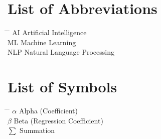 \documentclass[12pt,a4paper]{report}
\renewcommand{\baselinestretch}{1.5}
\begin{document}
\renewcommand\bibname{References} %








\clearpage %
\chapter*{List of Abbreviations}

\begin{tabbing}
    \hspace{2cm} \= \hspace{5cm} \= \kill
    AI \> Artificial Intelligence \\
    ML \> Machine Learning \\
    NLP \> Natural Language Processing \\
\end{tabbing}


\chapter*{List of Symbols}
\begin{tabbing}
    \hspace{2cm} \= \hspace{5cm} \= \kill
    $\alpha$ \> Alpha (Coefficient) \\
    $\beta$ \> Beta (Regression Coefficient) \\
    $\sum$ \> Summation \\
\end{tabbing}


\listoffigures

\listoftables
{}

\renewcommand{\contentsname}{\centering\vspace{-1cm}Contents}
\renewcommand{\baselinestretch}{0.35} %

\tableofcontents


\newpage
{} %

 




\end{document}

